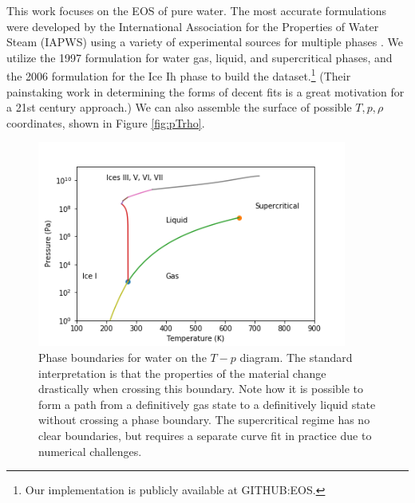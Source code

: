 \documentclass[AMA,STIX1COL]{WileyNJD-v2}
\begin{document}
This work focuses on the EOS of pure water. The most accurate
formulations were developed by the International Association for the
Properties of Water Steam (IAPWS) using a variety of experimental
sources for multiple phases \cite{wagner_iapws_2000,
  water_revised_2007, water_revised_2009}. We utilize the 1997
formulation for water gas, liquid, and supercritical phases, and the
2006 formulation for the Ice Ih phase to build the dataset.\footnote{Our
implementation is publicly available at GITHUB:EOS.} (Their
painstaking work in determining the forms of decent fits is a great
motivation for a 21st century approach.)
We can also assemble the surface of possible $T,p,\rho$ coordinates,
shown in Figure \ref{fig:pTrho}.
\begin{figure}
\centering
\includegraphics[width=4in]{../figures/phase_diagram.png}
\caption{\label{fig:phaseboundaries}Phase boundaries for water on the $T-p$ diagram. The standard
interpretation is that the properties of the material change
drastically when crossing this boundary. Note how it is possible to form a path from a
definitively gas state to a definitively liquid state without crossing
a phase boundary. The supercritical regime has no clear boundaries,
but requires a separate curve fit in practice due to numerical challenges.}
\end{figure}
\end{document}
